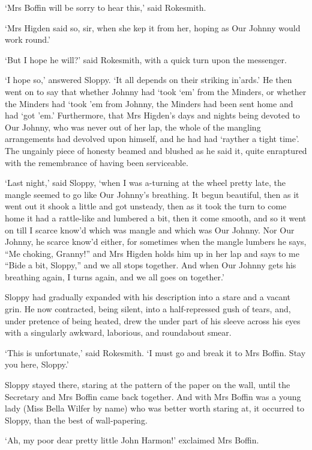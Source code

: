 ‘Mrs Boffin will be sorry to hear this,’ said Rokesmith.

‘Mrs Higden said so, sir, when she kep it from her, hoping as Our Johnny
would work round.’

‘But I hope he will?’ said Rokesmith, with a quick turn upon the
messenger.

‘I hope so,’ answered Sloppy. ‘It all depends on their striking
in’ards.’ He then went on to say that whether Johnny had ‘took ‘em’
from the Minders, or whether the Minders had ‘took ’em from Johnny,
the Minders had been sent home and had ‘got ’em.’ Furthermore, that Mrs
Higden’s days and nights being devoted to Our Johnny, who was never out
of her lap, the whole of the mangling arrangements had devolved upon
himself, and he had had ‘rayther a tight time’. The ungainly piece of
honesty beamed and blushed as he said it, quite enraptured with the
remembrance of having been serviceable.

‘Last night,’ said Sloppy, ‘when I was a-turning at the wheel pretty
late, the mangle seemed to go like Our Johnny’s breathing. It begun
beautiful, then as it went out it shook a little and got unsteady, then
as it took the turn to come home it had a rattle-like and lumbered a
bit, then it come smooth, and so it went on till I scarce know’d which
was mangle and which was Our Johnny. Nor Our Johnny, he scarce know’d
either, for sometimes when the mangle lumbers he says, “Me choking,
Granny!” and Mrs Higden holds him up in her lap and says to me “Bide a
bit, Sloppy,” and we all stops together. And when Our Johnny gets his
breathing again, I turns again, and we all goes on together.’

Sloppy had gradually expanded with his description into a stare and a
vacant grin. He now contracted, being silent, into a half-repressed gush
of tears, and, under pretence of being heated, drew the under part of
his sleeve across his eyes with a singularly awkward, laborious, and
roundabout smear.

‘This is unfortunate,’ said Rokesmith. ‘I must go and break it to Mrs
Boffin. Stay you here, Sloppy.’

Sloppy stayed there, staring at the pattern of the paper on the wall,
until the Secretary and Mrs Boffin came back together. And with Mrs
Boffin was a young lady (Miss Bella Wilfer by name) who was better worth
staring at, it occurred to Sloppy, than the best of wall-papering.

‘Ah, my poor dear pretty little John Harmon!’ exclaimed Mrs Boffin.

